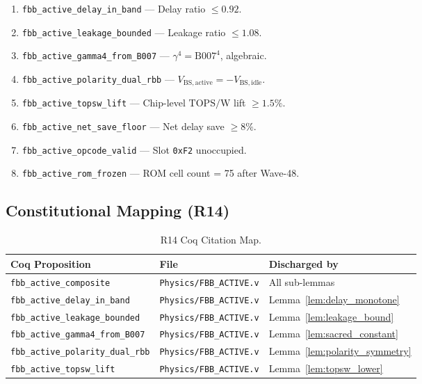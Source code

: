 \documentclass[12pt,a4paper]{report}
\theoremstyle{plain}
\theoremstyle{definition}
\theoremstyle{remark}
\newcommand{\opcode}[1]{\texttt{#1}}
\newcommand{\vbs}{V_{\mathrm{BS,active}}}
\newcommand{\gammaFour}{\gamma^{4}}
\newcommand{\topsw}{\mathrm{TOPS/W}}
\begin{document}
\begin{enumerate}[leftmargin=2em]
  \item \texttt{fbb\_active\_delay\_in\_band} — Delay ratio $\leq 0.92$.
  \item \texttt{fbb\_active\_leakage\_bounded} — Leakage ratio $\leq 1.08$.
  \item \texttt{fbb\_active\_gamma4\_from\_B007} — $\gammaFour = \mathrm{B007}^{4}$, algebraic.
  \item \texttt{fbb\_active\_polarity\_dual\_rbb} — $\vbs = -V_{\mathrm{BS,idle}}$.
  \item \texttt{fbb\_active\_topsw\_lift} — Chip-level $\topsw$ lift $\geq 1.5\%$.
  \item \texttt{fbb\_active\_net\_save\_floor} — Net delay save $\geq 8\%$.
  \item \texttt{fbb\_active\_opcode\_valid} — Slot \opcode{0xF2} unoccupied.
  \item \texttt{fbb\_active\_rom\_frozen} — ROM cell count = 75 after Wave-48.
\end{enumerate}

\subsection{Constitutional Mapping (R14)}

\begin{table}[h!]
\centering
\caption{R14 Coq Citation Map.}
\label{tab:r14_map}
\begin{tabular}{lll}
\toprule
Coq Proposition & File & Discharged by \\
\midrule
\texttt{fbb\_active\_composite} & \texttt{Physics/FBB\_ACTIVE.v} & All sub-lemmas \\
\texttt{fbb\_active\_delay\_in\_band} & \texttt{Physics/FBB\_ACTIVE.v} & Lemma~\ref{lem:delay_monotone} \\
\texttt{fbb\_active\_leakage\_bounded} & \texttt{Physics/FBB\_ACTIVE.v} & Lemma~\ref{lem:leakage_bound} \\
\texttt{fbb\_active\_gamma4\_from\_B007} & \texttt{Physics/FBB\_ACTIVE.v} & Lemma~\ref{lem:sacred_constant} \\
\texttt{fbb\_active\_polarity\_dual\_rbb} & \texttt{Physics/FBB\_ACTIVE.v} & Lemma~\ref{lem:polarity_symmetry} \\
\texttt{fbb\_active\_topsw\_lift} & \texttt{Physics/FBB\_ACTIVE.v} & Lemma~\ref{lem:topsw_lower} \\
\bottomrule
\end{tabular}
\end{table}
\end{document}
